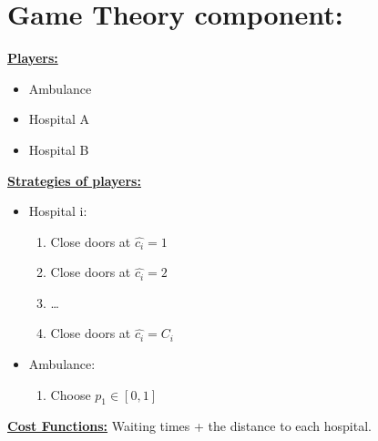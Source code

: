 \section{Game Theory component:} 

\textbf{\underline{Players:}} 
\begin{itemize}
    \item Ambulance
    \item Hospital A
    \item Hospital B
\end{itemize}

\noindent 
\textbf{\underline{Strategies of players:}}
\begin{itemize}
    \item Hospital i:    
    \begin{enumerate} 
        \item Close doors at \(\hat{c_i} = 1\) 
        \item Close doors at \(\hat{c_i} = 2\)
        \item \dots
        \item Close doors at \(\hat{c_i} = C_i\)
    \end{enumerate}
    \item Ambulance:
    \begin{enumerate}
        \item Choose \(p_1 \in [0,1]\) 
    \end{enumerate}
\end{itemize}

\noindent 
\textbf{\underline{Cost Functions:}} Waiting times + the distance to each hospital. 




